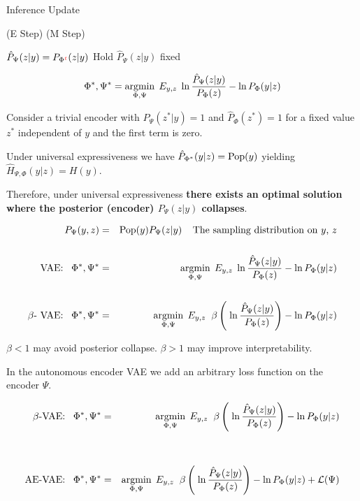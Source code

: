 {\vfill
\centerline{\hspace{1em} Inference \hspace{6em} Update \hspace{2.5em}~}
\centerline{(E Step) \hspace{6em} (M Step) ~}
\centerline{ $\hat{P}_\Psi(z|y) = P_{\Phi^{\color{red} t}}(z|y)$ \hspace{2.5em} Hold $\hat{P}_\Psi(z|y)$ fixed \hspace{0em}~}



$$\Phi^*,\Psi^* = \operatorname*{argmin}_{\Phi,\Psi}\;E_{y,z}  \;\ln \frac{\hat{P}_\Psi(z|y)}{P_\Phi(z)}  - \ln P_\Phi(y|z)$$

\vfill
Consider a trivial encoder with $P_\Psi(z^*|y) =1$ and $\hat{P}_\Phi(z^*) = 1$ for a fixed value $z^*$ independent of $y$ and the first term is zero.

\vfill
Under universal expressiveness we have $\hat{P}_{\Phi^*}(y|z) = \mathrm{Pop}(y)$ yielding {\color{red} $\hat{H}_{\Psi,\Phi}(y|z) = H(y)$}.

\vfill
Therefore, under universal expressiveness {\bf there exists an optimal solution where
the posterior (encoder) $P_\Psi(z|y)$ collapses}.


{\huge
\begin{eqnarray*}
P_\Psi(y,z) & = & \mathrm{Pop}(y)P_\Psi(z|y)\;\;\;\;\mbox{The sampling distribution on $y$, $z$} \\
\\
\mbox{VAE:}\;\;\;\Phi^*,\Psi^* &  = & \operatorname*{argmin}_{\Phi,\Psi}\;E_{y,z}  \;\ln \frac{\hat{P}_\Psi(z|y)}{P_\Phi(z)}  - \ln P_\Phi(y|z) \\
\\
\mbox{$\beta$-  VAE:}\;\;\;\Phi^*,\Psi^* &  = & \operatorname*{argmin}_{\Phi,\Psi}\;E_{y,z} \;\; \beta\left(\;\ln \frac{\hat{P}_\Psi(z|y)}{P_\Phi(z)}\right)  - \ln P_\Phi(y|z)
\end{eqnarray*}
}

\vfill
$\beta < 1$ may avoid posterior collapse.  $\beta > 1$ may improve interpretability.


In the autonomous encoder VAE we add an arbitrary loss function on the encoder $\Psi$.

{\huge
\begin{eqnarray*}
\mbox{$\beta$-VAE:}\;\;\;\Phi^*,\Psi^* &  = & \operatorname*{argmin}_{\Phi,\Psi}\;E_{y,z} \;\; \beta\left(\;\ln \frac{\hat{P}_\Psi(z|y)}{P_\Phi(z)}\right)  - \ln P_\Phi(y|z) \\
\\
\\
\mbox{AE-VAE:}\;\;\;\Phi^*,\Psi^* &  = & \operatorname*{argmin}_{\Phi,\Psi}\;E_{y,z} \;\; \beta\left(\;\ln \frac{\hat{P}_\Psi(z|y)}{P_\Phi(z)}\right)  - \ln P_\Phi(y|z) + {\cal L}(\Psi)
\end{eqnarray*}
}

}
